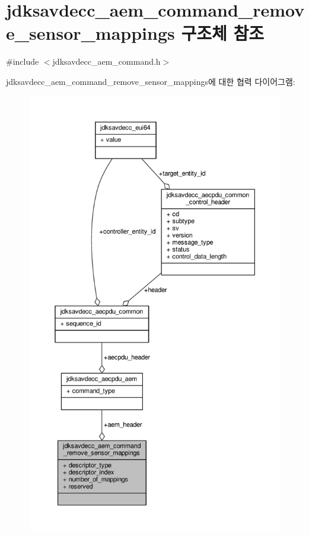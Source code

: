 \hypertarget{structjdksavdecc__aem__command__remove__sensor__mappings}{}\section{jdksavdecc\+\_\+aem\+\_\+command\+\_\+remove\+\_\+sensor\+\_\+mappings 구조체 참조}
\label{structjdksavdecc__aem__command__remove__sensor__mappings}


{\ttfamily \#include $<$jdksavdecc\+\_\+aem\+\_\+command.\+h$>$}



jdksavdecc\+\_\+aem\+\_\+command\+\_\+remove\+\_\+sensor\+\_\+mappings에 대한 협력 다이어그램\+:
\nopagebreak
\begin{figure}[H]
\begin{center}
\leavevmode
\includegraphics[height=550pt]{structjdksavdecc__aem__command__remove__sensor__mappings__coll__graph}
\end{center}
\end{figure}
